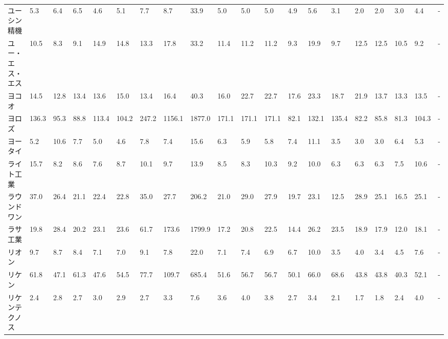 \begin{tabular}{llllllllllllllllllll}
ユーシン精機          &    5.3 &    6.4 &       6.5 &       4.6 &        5.1 &     7.7 &     8.7 &     33.9 &     5.0 &     5.0 &    5.0 &    4.9 &     5.6 &     3.1 &     2.0 &    2.0 &    3.0 &     4.4 &      - \\
ユー・エス・エス        &   10.5 &    8.3 &       9.1 &      14.9 &       14.8 &    13.3 &    17.8 &     33.2 &    11.4 &    11.2 &   11.2 &    9.3 &    19.9 &     9.7 &    12.5 &   12.5 &   10.5 &     9.2 &      - \\
ヨコオ             &   14.5 &   12.8 &      13.4 &      13.6 &       15.0 &    13.4 &    16.4 &     40.3 &    16.0 &    22.7 &   22.7 &   17.6 &    23.3 &    18.7 &    21.9 &   13.7 &   13.3 &    13.5 &      - \\
ヨロズ             &  136.3 &   95.3 &      88.8 &     113.4 &      104.2 &   247.2 &  1156.1 &   1877.0 &   171.1 &   171.1 &  171.1 &   82.1 &   132.1 &   135.4 &    82.2 &   85.8 &   81.3 &   104.3 &      - \\
ヨータイ            &    5.2 &   10.6 &       7.7 &       5.0 &        4.6 &     7.8 &     7.4 &     15.6 &     6.3 &     5.9 &    5.8 &    7.4 &    11.1 &     3.5 &     3.0 &    3.0 &    6.4 &     5.3 &      - \\
ライト工業           &   15.7 &    8.2 &       8.6 &       7.6 &        8.7 &    10.1 &     9.7 &     13.9 &     8.5 &     8.3 &   10.3 &    9.2 &    10.0 &     6.3 &     6.3 &    6.3 &    7.5 &    10.6 &      - \\
ラウンドワン          &   37.0 &   26.4 &      21.1 &      22.4 &       22.8 &    35.0 &    27.7 &    206.2 &    21.0 &    29.0 &   27.9 &   19.7 &    23.1 &    12.5 &    28.9 &   25.1 &   16.5 &    25.1 &      - \\
ラサ工業            &   19.8 &   28.4 &      20.2 &      23.1 &       23.6 &    61.7 &   173.6 &   1799.9 &    17.2 &    20.8 &   22.5 &   14.4 &    26.2 &    23.5 &    18.9 &   17.9 &   12.0 &    18.1 &      - \\
リオン             &    9.7 &    8.7 &       8.4 &       7.1 &        7.0 &     9.1 &     7.8 &     22.0 &     7.1 &     7.4 &    6.9 &    6.7 &    10.0 &     3.5 &     4.0 &    3.4 &    4.5 &     7.6 &      - \\
リケン             &   61.8 &   47.1 &      61.3 &      47.6 &       54.5 &    77.7 &   109.7 &    685.4 &    51.6 &    56.7 &   56.7 &   50.1 &    66.0 &    68.6 &    43.8 &   43.8 &   40.3 &    52.1 &      - \\
リケンテクノス         &    2.4 &    2.8 &       2.7 &       3.0 &        2.9 &     2.7 &     3.3 &      7.6 &     3.6 &     4.0 &    3.8 &    2.7 &     3.4 &     2.1 &     1.7 &    1.8 &    2.4 &     4.0 &      - \\

\end{tabular}
